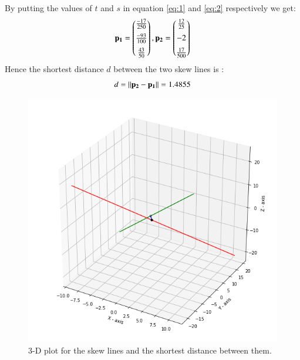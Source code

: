 \documentclass[journal,12pt,twocolumn]{IEEEtran}
\begin{document}
By putting the values of $t$ and $s$ in equation \eqref{eq:1} and \eqref{eq:2} respectively we get:
\begin{align}
    \mathbf{p_1}=\begin{pmatrix}\frac{-17}{250}\\[0.2cm]\frac{-93}{100}\\[0.2cm]\frac{43}{50}\end{pmatrix},\mathbf{p_2}=\begin{pmatrix}\frac{12}{25}\\[0.2cm]-2\\[0.2cm]\frac{17}{500}\end{pmatrix}
\end{align}
Hence the shortest distance $d$ between the two skew lines is :
$$d=\left\lVert\mathbf{p_2}-\mathbf{p_1}\right\rVert=1.4855$$
\begin{figure}[h]
\begin{center}
    \includegraphics[width=\columnwidth]{assignment2.png}
    \caption{3-D plot for the skew lines and the shortest distance between them.}
    \label{skew_lines}
\end{center}
\end{figure}
\end{document}
